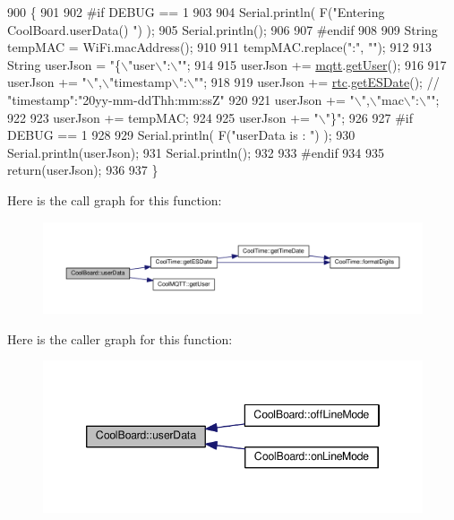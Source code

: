 \begin{DoxyCode}
900 \{
901 
902 \textcolor{preprocessor}{#if DEBUG == 1}
903 
904     Serial.println( F(\textcolor{stringliteral}{"Entering CoolBoard.userData() "}) );
905     Serial.println();
906 
907 \textcolor{preprocessor}{#endif}
908 
909     String tempMAC = WiFi.macAddress();
910 
911     tempMAC.replace(\textcolor{stringliteral}{":"}, \textcolor{stringliteral}{""});
912 
913     String userJson = \textcolor{stringliteral}{"\{\(\backslash\)"user\(\backslash\)":\(\backslash\)""};
914 
915     userJson += \hyperlink{classCoolBoard_a2399f44d7c23c1149a335cb3b46d90f1}{mqtt}.\hyperlink{classCoolMQTT_a373cc92fca7760d886f02d8a6e5b3f63}{getUser}();
916 
917     userJson += \textcolor{stringliteral}{"\(\backslash\)",\(\backslash\)"timestamp\(\backslash\)":\(\backslash\)""};
918 
919     userJson += \hyperlink{classCoolBoard_a50d2a6716879d64a85f3c6b44ad63275}{rtc}.\hyperlink{classCoolTime_ac4f32ee513c1328d984306645e8785a4}{getESDate}(); \textcolor{comment}{// "timestamp":"20yy-mm-ddThh:mm:ssZ"}
920 
921     userJson += \textcolor{stringliteral}{"\(\backslash\)",\(\backslash\)"mac\(\backslash\)":\(\backslash\)""};
922 
923     userJson += tempMAC;
924 
925     userJson += \textcolor{stringliteral}{"\(\backslash\)"\}"};
926 
927 \textcolor{preprocessor}{#if DEBUG == 1}
928 
929     Serial.println( F(\textcolor{stringliteral}{"userData is : "}) );
930     Serial.println(userJson);
931     Serial.println();
932 
933 \textcolor{preprocessor}{#endif  }
934     
935     \textcolor{keywordflow}{return}(userJson);
936     
937 \}
\end{DoxyCode}
Here is the call graph for this function\+:
\nopagebreak
\begin{figure}[H]
\begin{center}
\leavevmode
\includegraphics[width=350pt]{classCoolBoard_ae7358fb6e623cfc81b775f5f1734909b_cgraph}
\end{center}
\end{figure}
Here is the caller graph for this function\+:
\nopagebreak
\begin{figure}[H]
\begin{center}
\leavevmode
\includegraphics[width=346pt]{classCoolBoard_ae7358fb6e623cfc81b775f5f1734909b_icgraph}
\end{center}
\end{figure}



